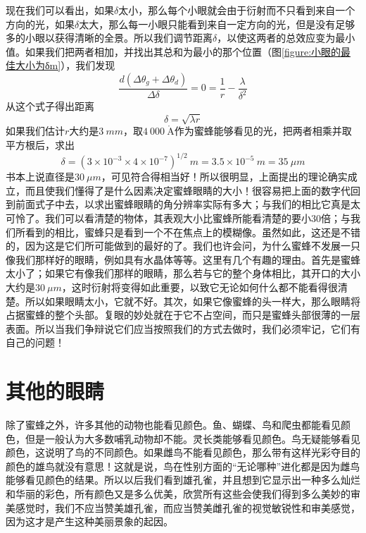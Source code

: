 现在我们可以看出，如果$\delta$太小，那么每个小眼就会由于衍射而不只看到来自一个方向的光，如果$\delta$太大，那么每一小眼只能看到来自一定方向的光，但是没有足够多的小眼以获得清晰的全景。所以我们调节距离$\delta$，以使这两者的总效应变为最小值。如果我们把两者相加，并找出其总和为最小的那个位置（图\ref{figure:小眼的最佳大小为δm}），我们发现
\begin{equation}
    \label{Eq:I:36:3}
    \frac{d(\Delta\theta_g + \Delta\theta_d)}{\Delta\delta} = 0 = \frac{1}{r} - \frac{\lambda}{\delta^2}
\end{equation}
从这个式子得出距离
\begin{equation}
    \label{Eq:I:36:4}
    \delta = \sqrt{\lambda r}
\end{equation}
如果我们估计$r$大约是$3~mm$，取$4~000~\mathring{\text{A}}$作为蜜蜂能够看见的光，把两者相乘并取平方根后，求出
\begin{equation}
    \label{Eq:I:36:5}
    \delta = (3\times 10^{-3} \times 4 \times 10^{-7})^{1/2}~m = 3.5 \times 10^{-5}~m = 35~\mu m
\end{equation}
书本上说直径是$30~\mu m$，可见符合得相当好！所以很明显，上面提出的理论确实成立，而且使我们懂得了是什么因素决定蜜蜂眼睛的大小！很容易把上面的数字代回到前面式子中去，以求出蜜蜂眼睛的角分辨率实际有多大；与我们的相比它真是太可怜了。我们可以看清楚的物体，其表观大小比蜜蜂所能看清楚的要小$30$倍；与我们所看到的相比，蜜蜂只是看到一个不在焦点上的模糊像。虽然如此，这还是不错的，因为这是它们所可能做到的最好的了。我们也许会问，为什么蜜蜂不发展一只像我们那样好的眼睛，例如具有水晶体等等。这里有几个有趣的理由。首先是蜜蜂太小了；如果它有像我们那样的眼睛，那么若与它的整个身体相比，其开口的大小大约是$30~\mu m$，这时衍射将变得如此重要，以致它无论如何什么都不能看得很清楚。所以如果眼睛太小，它就不好。其次，如果它像蜜蜂的头一样大，那么眼睛将占据蜜蜂的整个头部。复眼的妙处就在于它不占空间，而只是蜜蜂头部很薄的一层表面。所以当我们争辩说它们应当按照我们的方式去做时，我们必须牢记，它们有自己的问题！

\section{其他的眼睛}

除了蜜蜂之外，许多其他的动物也能看见颜色。鱼、蝴蝶、鸟和爬虫都能看见颜色，但是一般认为大多数哺乳动物却不能。灵长类能够看见颜色。鸟无疑能够看见颜色，这说明了鸟的不同颜色。如果雌鸟不能看见颜色，那么带有这样光彩夺目的颜色的雄鸟就没有意思！这就是说，鸟在性别方面的“无论哪种”进化都是因为雌鸟能够看见颜色的结果。所以以后我们看到雄孔雀，并且想到它显示出一种多么灿烂和华丽的彩色，所有颜色又是多么优美，欣赏所有这些会使我们得到多么美妙的审美感觉时，我们不应当赞美雄孔雀，而应当赞美雌孔雀的视觉敏锐性和审美感觉，因为这才是产生这种美丽景象的起因。

